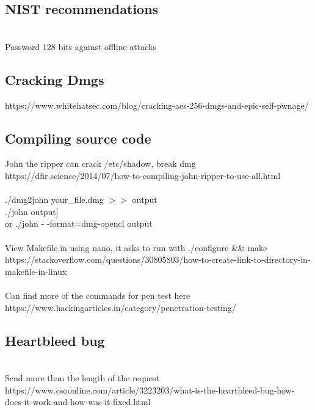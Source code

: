 \documentclass[11pt]{article}
\begin{document}
\begin{multicols*}{3}
\subsection*{NIST recommendations}\\
Password 128 bits against offline attacks 
\subsection*{Cracking Dmgs}
\textcolor{link}{https://www.whitehatsec.com/blog/cracking-aes-256-dmgs-and-epic-self-pwnage/}
\\
\subsection*{Compiling source code}
John the ripper can crack /etc/shadow, break dmg\\
\textcolor{link}{https://dfir.science/2014/07/how-to-compiling-john-ripper-to-use-all.html}\\
\\./dmg2john your\_file.dmg $>>$ output
\\./john output]\\
or ./john - -format=dmg-opencl output\\
\\
View Makefile.in using nano, it asks to run with ./configure && make\\
\textcolor{link}{https://stackoverflow.com/questions/30805803/how-to-create-link-to-directory-in-makefile-in-linux}\\
\\
Can find more of the commands for pen test here\\
\textcolor{link}{https://www.hackingarticles.in/category/penetration-testing/}
\subsection*{Heartbleed bug}\\
Send more than the length of the request
\textcolor{link}{https://www.csoonline.com/article/3223203/what-is-the-heartbleed-bug-how-does-it-work-and-how-was-it-fixed.html}

\end{multicols*}
\end{document}
